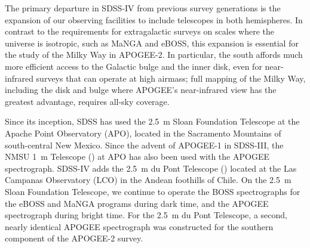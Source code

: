 The primary departure in SDSS-IV from previous survey generations is
the expansion of our observing facilities to include telescopes in
both hemispheres. In contrast to the requirements for extragalactic
surveys on scales where the universe is isotropic, such as MaNGA and
eBOSS, this expansion is essential for the study of the Milky Way in
APOGEE-2.  In particular, the south affords much more efficient access
to the Galactic bulge and the inner disk, even for near-infrared
surveys that can operate at high airmass; full mapping of the Milky
Way, including the disk and bulge where APOGEE's near-infrared view has
the greatest advantage, requires all-sky coverage.

Since its inception, SDSS has used the 2.5~m Sloan Foundation
Telescope at the Apache Point Observatory (APO), located in the
Sacramento Mountains of south-central New Mexico. Since the advent of
APOGEE-1 in SDSS-III, the NMSU 1~m Telescope
(\citealt{holtzman10a}) at APO has also been used with the APOGEE
spectrograph. SDSS-IV adds the 2.5~m du Pont Telescope
(\citealt{bowen73a}) located at the Las Campanas Observatory (LCO) in
the Andean foothills of Chile.  On the 2.5~m Sloan Foundation
Telescope, we continue to operate the BOSS spectrographs for the eBOSS
and MaNGA programs during dark time, and the APOGEE spectrograph
during bright time.  For the 2.5~m du Pont Telescope, a second,
nearly identical APOGEE spectrograph was constructed for the southern
component of the APOGEE-2 survey.
